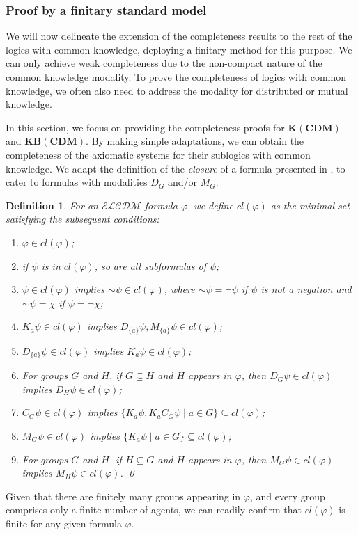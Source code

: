 \documentclass{article}
\newtheorem{definition}[theorem]{Definition}%
\newcommand{\NEG}{\ensuremath{\mathord\sim}}
\renewcommand{\phi}{\varphi}
\newcommand{\langcdm}{\ensuremath{\mathcal{ELCDM}}\xspace}
\newcommand{\KCDM}{\ensuremath{\mathbf{K(CDM)}}\xspace}
\newcommand{\KBCDM}{\ensuremath{\mathbf{KB(CDM)}}\xspace}
\begin{document}
\subsubsection{Proof by a finitary standard model}
\label{sec:completeness5}

We will now delineate the extension of the completeness results to the rest of the logics with common knowledge, deploying a finitary method for this purpose. We can only achieve weak completeness due to the non-compact nature of the common knowledge modality. To prove the completeness of logics with common knowledge, we often also need to address the modality for distributed or mutual knowledge.

In this section, we focus on providing the completeness proofs for \KCDM and \KBCDM. By making simple adaptations, we can obtain the completeness of the axiomatic systems for their sublogics with common knowledge. We adapt the definition of the \emph{closure} of a formula presented in \cite{WA2020} , to cater to formulas with modalities $D_G$ and/or $M_G$.

\begin{definition}\label{def:cl}
For an \langcdm-formula $\phi$, we define $cl(\phi)$ as the minimal set satisfying the subsequent conditions:
\begin{enumerate}
\item\label{it:cl-id} $\phi\in cl(\phi)$;
\item\label{it:cl-sub} if $\psi$ is in $cl(\phi)$, so are all subformulas of $\psi$;
\item\label{it:cl-neg} $\psi\in cl(\phi)$ implies ${\sim}\psi\in cl(\phi)$, where $\NEG\psi=\neg\psi$ if $\psi$ is not a negation and $\NEG\psi=\chi$ if $\psi=\neg\chi$;
\item\label{it:cl-1} $K_a\psi\in cl(\phi)$ implies $D_{\{a\}}\psi, M_{\{a\}}\psi\in cl(\phi)$;
\item\label{it:cl-d1} $D_{\{a\}}\psi\in cl(\phi)$ implies $K_a\psi\in cl(\phi)$;
\item\label{it:cl-d2} For groups $G$ and $H$, if $G \subseteq H$ and $H$ appears in $\phi$, then $D_G\psi\in cl(\phi)$ implies $D_H\psi\in cl(\phi)$;
\item\label{it:cl-c1} $C_G\psi\in cl(\phi)$ implies $\{ K_a\psi, K_a C_G\psi \mid a \in G \} \subseteq cl(\phi)$;
\item\label{it:cl-m1} $M_G\psi\in cl(\phi)$ implies $\{ K_a\psi \mid a \in G\} \subseteq cl(\phi)$;
\item\label{it:cl-m2} For groups $G$ and $H$, if $H \subseteq G$ and $H$ appears in $\phi$, then $M_G\psi\in cl(\phi)$ implies $M_H\psi\in cl(\phi)$.
\qed
\end{enumerate}
\end{definition}
%
Given that there are finitely many groups appearing in $\phi$, and every group comprises only a finite number of agents, we can readily confirm that $cl(\phi)$ is finite for any given formula $\phi$.
\end{document}

